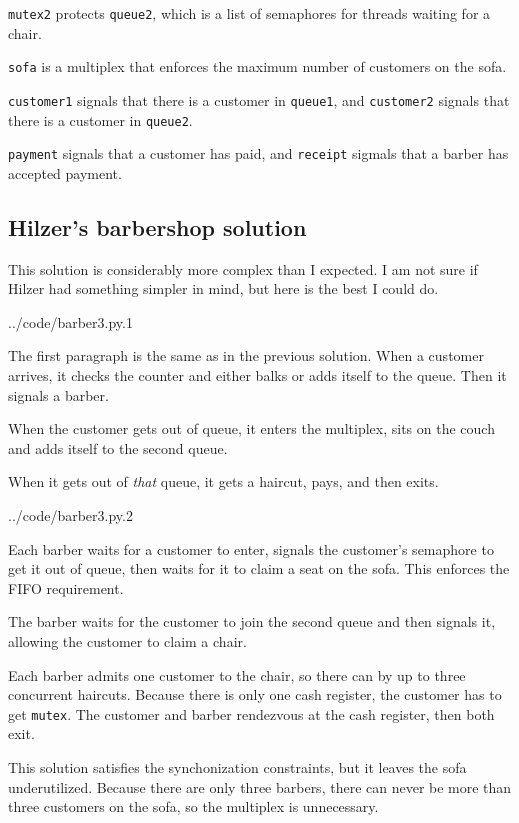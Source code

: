 \documentclass{book}
\begin{document}
    {\tt mutex2} protects {\tt queue2}, which is a list
of semaphores for threads waiting for a chair.

    {\tt sofa} is a multiplex that enforces the maximum number of customers
on the sofa.

    {\tt customer1} signals that there is a customer in {\tt queue1}, and
    {\tt customer2} signals that there is a customer in {\tt queue2}.

{\tt payment} signals that a customer has paid, and {\tt receipt}
sigmals that a barber has accepted payment.



\subsection {Hilzer's barbershop solution}

This solution is considerably more complex than I expected.  I
am not sure if Hilzer had something simpler in mind, but here is the
best I could do.

\newpage

{../code/barber3.py.1}

The first paragraph is the same as in the previous solution.  When
a customer arrives, it checks the counter and either balks or adds
itself to the queue.  Then it signals a barber.

When the customer gets out of queue, it enters the multiplex,
sits on the couch and adds itself to the second queue.

When it gets out of {\em that} queue, it gets a haircut, pays,
and then exits.


{../code/barber3.py.2}

Each barber waits for a customer to enter, signals the customer's
semaphore to get it out of queue, then waits for it to claim a seat
on the sofa.  This enforces the FIFO requirement.

The barber waits for the customer to join the second queue and then
signals it, allowing the customer to claim a chair.

Each barber admits one customer to the chair, so there can by up
to three concurrent haircuts.  Because there is only one cash
register, the customer has to get {\tt mutex}.  The customer
and barber rendezvous at the cash register, then both exit.

This solution satisfies the synchonization constraints, but it leaves
the sofa underutilized.  Because there are only three barbers, there
can never be more than three customers on the sofa, so the multiplex
is unnecessary.
\end{document}
